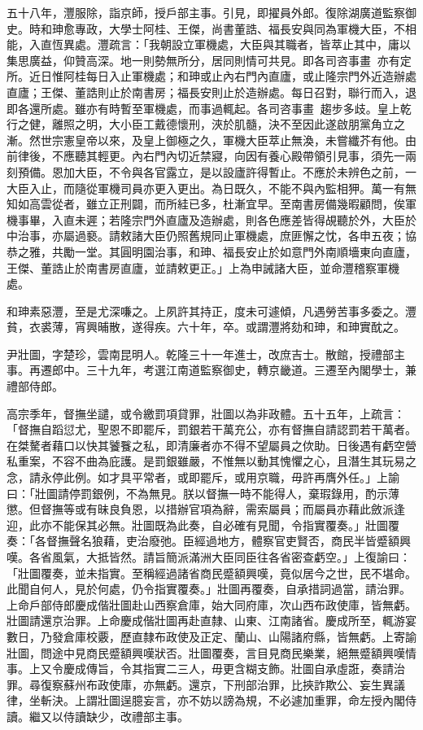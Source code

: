 \begin{pinyinscope}
五十八年，灃服除，詣京師，授戶部主事。引見，即擢員外郎。復除湖廣道監察御史。時和珅愈專政，大學士阿桂、王傑，尚書董誥、福長安與同為軍機大臣，不相能，入直恆異處。灃疏言：「我朝設立軍機處，大臣與其職者，皆萃止其中，庸以集思廣益，仰贊高深。地一則勢無所分，居同則情可共見。即各司咨事畫，亦有定所。近日惟阿桂每日入止軍機處；和珅或止內右門內直廬，或止隆宗門外近造辦處直廬；王傑、董誥則止於南書房；福長安則止於造辦處。每日召對，聯行而入，退即各還所處。雖亦有時暫至軍機處，而事過輒起。各司咨事畫，趨步多歧。皇上乾行之健，離照之明，大小臣工戴德懷刑，浹於肌髓，決不至因此遂啟朋黨角立之漸。然世宗憲皇帝以來，及皇上御極之久，軍機大臣萃止無渙，未嘗纖芥有他。由前律後，不應聽其輕更。內右門內切近禁寢，向因有養心殿帶領引見事，須先一兩刻預備。恩加大臣，不令與各官露立，是以設廬許得暫止。不應於未辨色之前，一大臣入止，而隨從軍機司員亦更入更出。為日既久，不能不與內監相狎。萬一有無知如高雲從者，雖立正刑闢，而所絓已多，杜漸宜早。至南書房備幾暇顧問，俟軍機事畢，入直未遲；若隆宗門外直廬及造辦處，則各色應差皆得覘聽於外，大臣於中治事，亦屬過褻。請敕諸大臣仍照舊規同止軍機處，庶匪懈之忱，各申五夜；協恭之雅，共勵一堂。其圓明園治事，和珅、福長安止於如意門外南順墻東向直廬，王傑、董誥止於南書房直廬，並請敕更正。」上為申誡諸大臣，並命灃稽察軍機處。

和珅素惡灃，至是尤深嗛之。上夙許其持正，度未可遽傾，凡遇勞苦事多委之。灃貧，衣裘薄，宵興晡散，遂得疾。六十年，卒。或謂灃將劾和珅，和珅實酖之。

尹壯圖，字楚珍，雲南昆明人。乾隆三十一年進士，改庶吉士。散館，授禮部主事。再遷郎中。三十九年，考選江南道監察御史，轉京畿道。三遷至內閣學士，兼禮部侍郎。

高宗季年，督撫坐譴，或令繳罰項貸罪，壯圖以為非政體。五十五年，上疏言：「督撫自蹈愆尤，聖恩不即罷斥，罰銀若干萬充公，亦有督撫自請認罰若干萬者。在桀驁者藉口以快其饕餮之私，即清廉者亦不得不望屬員之佽助。日後遇有虧空營私重案，不容不曲為庇護。是罰銀雖嚴，不惟無以動其愧懼之心，且潛生其玩易之念，請永停此例。如才具平常者，或即罷斥，或用京職，毋許再膺外任。」上諭曰：「壯圖請停罰銀例，不為無見。朕以督撫一時不能得人，棄瑕錄用，酌示薄懲。但督撫等或有昧良負恩，以措辦官項為辭，需索屬員；而屬員亦藉此斂派逢迎，此亦不能保其必無。壯圖既為此奏，自必確有見聞，令指實覆奏。」壯圖覆奏：「各督撫聲名狼藉，吏治廢弛。臣經過地方，體察官吏賢否，商民半皆蹙額興嘆。各省風氣，大抵皆然。請旨簡派滿洲大臣同臣往各省密查虧空。」上復諭曰：「壯圖覆奏，並未指實。至稱經過諸省商民蹙額興嘆，竟似居今之世，民不堪命。此聞自何人，見於何處，仍令指實覆奏。」壯圖再覆奏，自承措詞過當，請治罪。上命戶部侍郎慶成偕壯圖赴山西察倉庫，始大同府庫，次山西布政使庫，皆無虧。壯圖請還京治罪。上命慶成偕壯圖再赴直隸、山東、江南諸省。慶成所至，輒游宴數日，乃發倉庫校覈，歷直隸布政使及正定、蘭山、山陽諸府縣，皆無虧。上寄諭壯圖，問途中見商民蹙額興嘆狀否。壯圖覆奏，言目見商民樂業，絕無蹙額興嘆情事。上又令慶成傳旨，令其指實二三人，毋更含糊支飾。壯圖自承虛誑，奏請治罪。尋復察蘇州布政使庫，亦無虧。還京，下刑部治罪，比挾詐欺公、妄生異議律，坐斬決。上謂壯圖逞臆妄言，亦不妨以謗為規，不必遽加重罪，命左授內閣侍讀。繼又以侍讀缺少，改禮部主事。


\end{pinyinscope}
